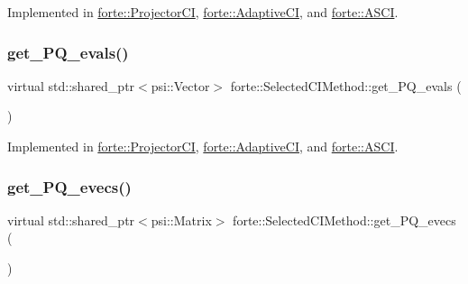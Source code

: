 Implemented in \mbox{\hyperlink{classforte_1_1_projector_c_i_aa812688cd77719876ea535f49b835c57}{forte\+::\+Projector\+CI}}, \mbox{\hyperlink{classforte_1_1_adaptive_c_i_a56cd790d0780b1af0136341663204e41}{forte\+::\+Adaptive\+CI}}, and \mbox{\hyperlink{classforte_1_1_a_s_c_i_ac497073adeab7700979678c15dcb475e}{forte\+::\+A\+S\+CI}}.

\mbox{\label{classforte_1_1_selected_c_i_method_a675d28ae66341b8cfabb2953c936621c}} 
\subsubsection{\texorpdfstring{get\+\_\+\+P\+Q\+\_\+evals()}{get\_PQ\_evals()}}
{\footnotesize\ttfamily virtual std\+::shared\+\_\+ptr$<$psi\+::\+Vector$>$ forte\+::\+Selected\+C\+I\+Method\+::get\+\_\+\+P\+Q\+\_\+evals (\begin{DoxyParamCaption}{ }\end{DoxyParamCaption})\hspace{0.3cm}{\ttfamily [pure virtual]}}



Implemented in \mbox{\hyperlink{classforte_1_1_projector_c_i_ad6e48a524b58412a569858c9c2b1c232}{forte\+::\+Projector\+CI}}, \mbox{\hyperlink{classforte_1_1_adaptive_c_i_ada31e72d787a94730002e80f0f93deca}{forte\+::\+Adaptive\+CI}}, and \mbox{\hyperlink{classforte_1_1_a_s_c_i_a13310cf1f39f174d298194efea95572f}{forte\+::\+A\+S\+CI}}.

\mbox{\label{classforte_1_1_selected_c_i_method_a5e5212836aa0dc35f98238d1f426abed}} 
\subsubsection{\texorpdfstring{get\+\_\+\+P\+Q\+\_\+evecs()}{get\_PQ\_evecs()}}
{\footnotesize\ttfamily virtual std\+::shared\+\_\+ptr$<$psi\+::\+Matrix$>$ forte\+::\+Selected\+C\+I\+Method\+::get\+\_\+\+P\+Q\+\_\+evecs (\begin{DoxyParamCaption}{ }\end{DoxyParamCaption})\hspace{0.3cm}{\ttfamily [pure virtual]}}



